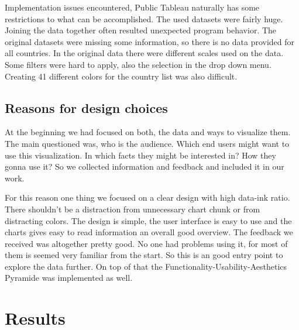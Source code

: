 \documentclass{vgtc}                          %
\begin{document}
Implementation issues encountered, Public Tableau naturally has some restrictions to what can be accomplished.
The used datasets were fairly huge. Joining the data together often resulted unexpected program behavior. The original datasets were missing some information, so there is no data provided for all countries. In the original data there were different scales used on the data. Some filters were hard to apply, also the selection in the drop down menu.
Creating 41 different colors for the country list was also difficult.

\subsection{Reasons for design choices}
At the beginning we had focused on both, the data and ways to visualize them. The main questioned was, who is the audience. Which end users might want to use this visualization. In which facts they might be interested in? How they gonna use it? So we collected information and feedback and included it in our work.

For this reason one thing we focused on a clear design with high data-ink ratio. There shouldn’t be a distraction from unnecessary chart chunk or from distracting colors. The design is simple, the user interface is easy to use and the charts gives easy to read information an overall good overview.
The feedback we received was altogether pretty good. No one had problems using it, for most of them is seemed very familiar from the start. So this is an good entry point to explore the data further.
On top of that the Functionality-Usability-Aesthetics Pyramide was implemented as well.

\section{Results}
\end{document}
